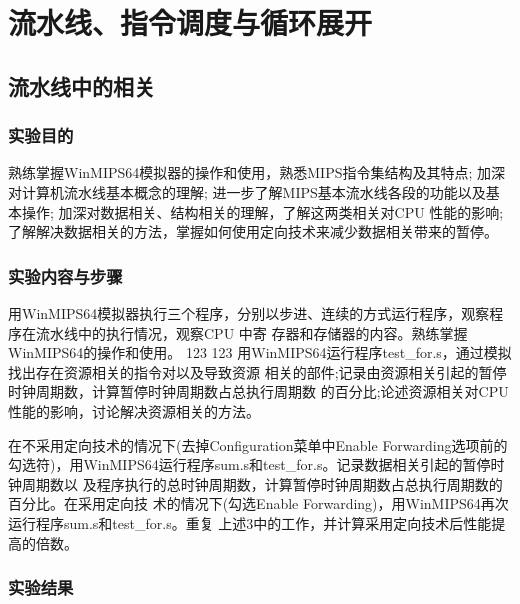 \documentclass{ctexrep}
\begin{document}

\tableofcontents

\chapter{流水线、指令调度与循环展开}

\section{流水线中的相关}

\subsection{实验目的}
\begin{outline}[enumerate]
    \1 熟练掌握WinMIPS64模拟器的操作和使用，熟悉MIPS指令集结构及其特点;
    \1 加深对计算机流水线基本概念的理解;
    \1 进一步了解MIPS基本流水线各段的功能以及基本操作;
    \1 加深对数据相关、结构相关的理解，了解这两类相关对CPU 性能的影响;
    \1 了解解决数据相关的方法，掌握如何使用定向技术来减少数据相关带来的暂停。
\end{outline}
\subsection{实验内容与步骤}
\begin{outline}[enumerate]
    \1 用WinMIPS64模拟器执行三个程序，分别以步进、连续的方式运行程序，观察程序在流水线中的执行情况，观察CPU 中寄 存器和存储器的内容。熟练掌握WinMIPS64的操作和使用。
123 123
    \1 用WinMIPS64运行程序test_for.s，通过模拟找出存在资源相关的指令对以及导致资源 相关的部件;记录由资源相关引起的暂停时钟周期数，计算暂停时钟周期数占总执行周期数 的百分比;论述资源相关对CPU性能的影响，讨论解决资源相关的方法。

    \1 在不采用定向技术的情况下(去掉Configuration菜单中Enable Forwarding选项前的 勾选符)，用WinMIPS64运行程序sum.s和test_for.s。记录数据相关引起的暂停时钟周期数以 及程序执行的总时钟周期数，计算暂停时钟周期数占总执行周期数的百分比。在采用定向技 术的情况下(勾选Enable Forwarding)，用WinMIPS64再次运行程序sum.s和test_for.s。重复 上述3中的工作，并计算采用定向技术后性能提高的倍数。
\end{outline}
\subsection{实验结果}
\end{document}
